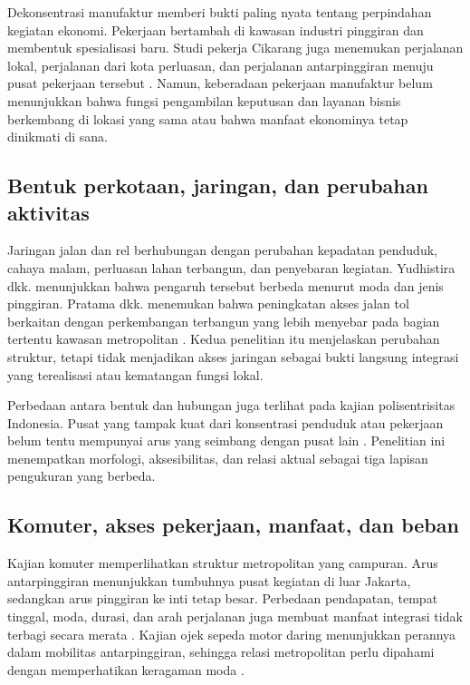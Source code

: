 \documentclass[12pt,a4paper,oneside,openany,indonesian]{report}
\begin{document}
Dekonsentrasi manufaktur memberi bukti paling nyata tentang perpindahan kegiatan ekonomi. Pekerjaan bertambah di kawasan industri pinggiran dan membentuk spesialisasi baru. Studi pekerja Cikarang juga menemukan perjalanan lokal, perjalanan dari kota perluasan, dan perjalanan antarpinggiran menuju pusat pekerjaan tersebut \parencite{hudalahetal2013,permatasarihudalah2013}. Namun, keberadaan pekerjaan manufaktur belum menunjukkan bahwa fungsi pengambilan keputusan dan layanan bisnis berkembang di lokasi yang sama atau bahwa manfaat ekonominya tetap dinikmati di sana.

\subsection{Bentuk perkotaan, jaringan, dan perubahan aktivitas}

Jaringan jalan dan rel berhubungan dengan perubahan kepadatan penduduk, cahaya malam, perluasan lahan terbangun, dan penyebaran kegiatan. Yudhistira dkk. menunjukkan bahwa pengaruh tersebut berbeda menurut moda dan jenis pinggiran. Pratama dkk. menemukan bahwa peningkatan akses jalan tol berkaitan dengan perkembangan terbangun yang lebih menyebar pada bagian tertentu kawasan metropolitan \parencite{yudhistiraetal2019,pratamaetal2022}. Kedua penelitian itu menjelaskan perubahan struktur, tetapi tidak menjadikan akses jaringan sebagai bukti langsung integrasi yang terealisasi atau kematangan fungsi lokal.

Perbedaan antara bentuk dan hubungan juga terlihat pada kajian polisentrisitas Indonesia. Pusat yang tampak kuat dari konsentrasi penduduk atau pekerjaan belum tentu mempunyai arus yang seimbang dengan pusat lain \parencite{sadewoetal2021}. Penelitian ini menempatkan morfologi, aksesibilitas, dan relasi aktual sebagai tiga lapisan pengukuran yang berbeda.

\subsection{Komuter, akses pekerjaan, manfaat, dan beban}

Kajian komuter memperlihatkan struktur metropolitan yang campuran. Arus antarpinggiran menunjukkan tumbuhnya pusat kegiatan di luar Jakarta, sedangkan arus pinggiran ke inti tetap besar. Perbedaan pendapatan, tempat tinggal, moda, durasi, dan arah perjalanan juga membuat manfaat integrasi tidak terbagi secara merata \parencite{aritenang2023,aritenang2022}. Kajian ojek sepeda motor daring menunjukkan perannya dalam mobilitas antarpinggiran, sehingga relasi metropolitan perlu dipahami dengan memperhatikan keragaman moda \parencite{aritenang2024}.
\end{document}
